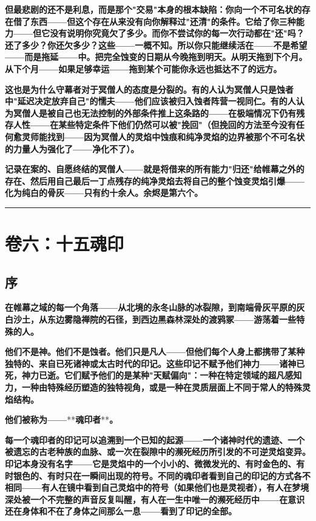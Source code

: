 \documentclass[12pt,a4paper,openany]{ctexbook}
\begin{document}
\textbf{但最悲剧的还不是利息，而是那个"交易"本身的根本缺陷：你向一个不可名状的存在借了东西——但这个存在从来没有向你解释过"还清"的条件。它给了你三种能力——但它没有说明你究竟欠了多少。而你不尝试你的每一次行动都在"还"吗？还了多少？你还欠多少？这些——一概不知。所以你只能继续活在——不是希望——而是拖延——中。把完全蚀变的日期从今晚拖到明天。从明天拖到下个月。从下个月——如果足够幸运——拖到某个可能你永远也抵达不了的远方。}


\textbf{这也是为什么守幕者对于冥僧人的态度是分裂的。有的人认为冥僧人只是蚀者中"延迟决定放弃自己"的懦夫——他们应该被归入蚀者阵营一视同仁。有的人认为冥僧人是被自己也无法控制的外部条件推上这条路的——在极端情况下仍有残存人性——在某些特定条件下他们仍然可以被"挽回"（但挽回的方法至今没有任何愈灵师能找到——因为冥僧人的灵焰中蚀痕和纯净灵焰的边界被那个不可名状的力量人为强化了——净化不了）。}


\textbf{记录在案的、自愿终结的冥僧人——就是将借来的所有能力"归还"给帷幕之外的存在、然后用自己最后一丁点残存的纯净灵焰去将自己的整个蚀变灵焰引爆——化为纯白的骨灰——只有约十余人。余烬是第六个。}


\bigskip\hrule\bigskip


\chapter{卷六：十五魂印}


\section*{序}


\textbf{在帷幕之域的每一个角落——从北境的永冬山脉的冰裂隙，到南端骨灰平原的灰白沙土，从东边雾隐禅院的石径，到西边黑森林深处的渡鸦冢——游荡着一些特殊的人。}


\textbf{他们不是神。他们不是蚀者。他们只是凡人——但他们每个人身上都携带了某种独特的、来自已死诸神或太古时代的印记。这些印记不赋予他们神力——诸神已死，神力已逝。它们赋予他们的是某种"天赋偏向"：一种在特定领域的超凡感知力，一种由特殊经历塑造的独特视角，或是一种在灵质层面上不同于常人的特殊灵焰结构。}


\textbf{他们被称为——}**\textbf{魂印者}**\textbf{。}


\textbf{每一个魂印者的印记可以追溯到一个已知的起源——一个诸神时代的遗迹、一个被遗忘的古老种族的血脉、或一次在裂隙中的濒死经历所引发的不可逆灵焰变异。印记本身没有名字——它是灵焰中的一个小小的、微微发光的、有时金色的、有时银色的、有时只在一瞬间出现的符号。不同的魂印者看到自己的印记的方式各不相同——有人在镜中看到自己灵焰中的符号（如果他们也是灵视者），有人在梦境深处被一个不完整的声音反复叫醒，有人在一生中唯一的濒死经历中——在意识还在身体和不在了身体之间那么一息——看到了印记的全部。}
\end{document}
